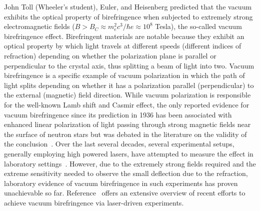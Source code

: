 \documentclass[12pt,epjc3]{svjour3}\sloppy
\begin{document}
John Toll (Wheeler's student), Euler, and Heisenberg predicted that the vacuum exhibits the optical property of birefringence when subjected to extremely strong electromagnetic fields ($B > B_{C} \approx m_e^2c^3/\hbar e \approx 10^8$ Tesla), the so-called vacuum birefringence effect\cite{DISPERSIONRELATIONLIGHT,heisenbergFolgerungenAusDiracschen1936}. 
Birefringent materials are notable because they exhibit an optical property by which light travels at different speeds (different indices of refraction) depending on whether the polarization plane is parallel or perpendicular to the crystal axis, thus splitting a beam of light into two. 
Vacuum birefringence is a specific example of vacuum polarization in which the path of light splits depending on whether it has a polarization parallel (perpendicular) to the external (magnetic) field direction. 
While vacuum polarization\cite{heisenbergFolgerungenAusDiracschen1936} is responsible for the well-known Lamb shift and Casmir effect\cite{lamb_fine_1947,casimir_influence_1948}, the only reported evidence for vacuum birefringence since its prediction in 1936 has been associated with enhanced linear polarization of light passing through strong magnetic fields near the surface of neutron stars\cite{Mignani:2016fwz} but was debated in the literature on the validity of the conclusion~\cite{Capparelli:2017mlv}. Over the last several decades, several experimental setups, generally employing high powered lasers, have attempted to measure the effect in laboratory settings~\cite{vallePVLASExperimentMeasuring2016}. However, due to the extremely strong fields required and the extreme sensitivity needed to observe the small deflection due to the refraction, laboratory evidence of vacuum birefringence in such experiments has proven unachievable so far. Reference~\cite{PVLASExperiment25} offers an extensive overview of recent efforts to achieve vacuum birefringence via laser-driven experiments.
\end{document}
